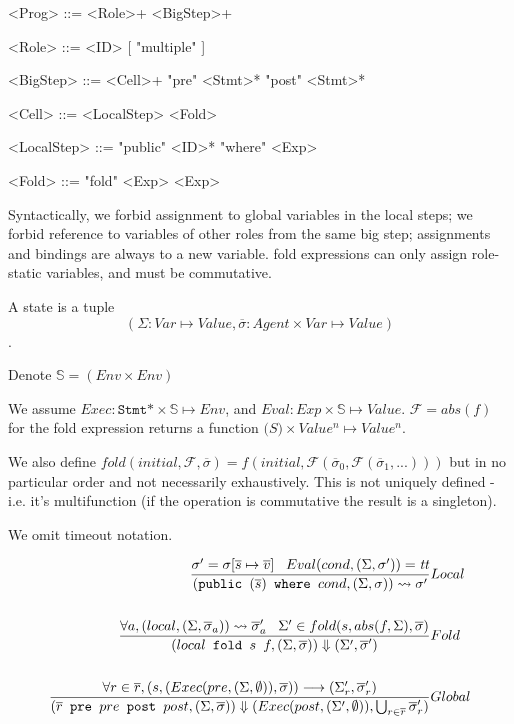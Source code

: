 \documentclass[acmsmall,review,anonymous]{acmart}\settopmatter{printfolios=true}
\begin{document}
\begin{grammar}
	<Prog>      ::= <Role>+ <BigStep>+

	<Role>		::= <ID> [ "multiple" ]

	<BigStep>   ::= <Cell>+ "pre" <Stmt>* "post" <Stmt>*

	<Cell> 		::= <LocalStep> <Fold>

	<LocalStep> ::= "public" <ID>* "where" <Exp>
	
	<Fold>      ::= "fold" <Exp> <Exp>
\end{grammar}

Syntactically, we forbid assignment to global variables in the local steps;
we forbid reference to variables of other roles from the same big step;
assignments and bindings are always to a new variable.
fold expressions can only assign role-static variables, and must be commutative.

A state is a tuple 
\[
	(\Sigma: Var \mapsto Value, \overline{\sigma}: Agent \times Var \mapsto Value )
\].

Denote $\mathbb{S} = (Env \times Env)$


\newcommand{\G}{\Sigma}
\newcommand{\s}{\sigma}
\newcommand{\R}{\overline{\s}}

We assume $Exec: \texttt{Stmt*} \times \mathbb{S} \mapsto Env $, and $Eval: Exp \times \mathbb{S} \mapsto Value$.
$\mathcal{F} = abs(f)$ for the fold expression returns a function $\mathbb(S) \times Value^n \mapsto Value^n$.

We also define $fold(initial, \mathcal{F}, \R)= f(initial, \mathcal{F}(\R_0, \mathcal{F}(\R_1, ...)))$ but in no particular order and not necessarily exhaustively.
This is not uniquely defined - i.e. it's multifunction (if the operation is commutative the result is a singleton).

We omit timeout notation.

\begin{align*}
	\judge{&Local}{
		\s' = \s[\overline{s} \mapsto \overline{v}] \;\;\;
		Eval(cond, (\G, \s')) = \emph{tt}
	}{
		(\texttt{public }(\overline{s}) \texttt{ where } cond, (\G, \s)) \rightsquigarrow \s'
	}\\
	\\
	\judge{&Fold}{
		\forall a, (local, (\G, \R_a)) \rightsquigarrow \R'_a \;\;\;
		\G' \in fold(s, abs(f, \G), \R)
	}{
		(local \texttt{ fold } s \texttt{ } f, (\G, \R)) \Downarrow (\G', \R')
	}\\
	\\
	\judge{&Global}{
		\forall r \in \overline{r}, (s, (Exec(pre, (\G, \emptyset)), \R)) \longrightarrow (\G'_r, \R'_r)
	}{
		(\overline{r} \texttt{ pre } pre \texttt{ post } post, (\G, \R))
		\Downarrow (Exec(post, (\G', \emptyset)), \bigcup_{r\in \overline{r}} \R'_r)
	}
\end{align*}
\end{document}
